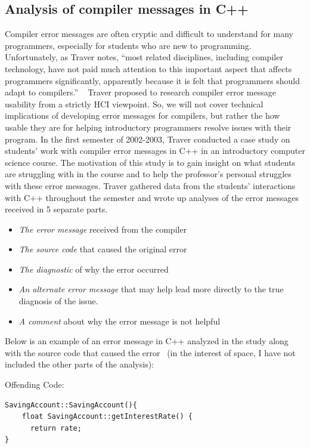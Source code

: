 \documentclass{sig-alternate}
\begin{document}
\subsection{Analysis of compiler messages in C++}\label{subsec:compiler analysis}


Compiler error messages are often cryptic and difficult to understand for many programmers, especially for students who are new to programming.
Unfortunately, as Traver notes, ``most related disciplines, including compiler technology, have not paid much attention to this important aspect that affects programmers significantly, apparently because it is felt that programmers should adapt to compilers.'' ~\cite{Traver:2010}
Traver proposed to research compiler error message usability from a strictly HCI viewpoint.
So, we will not cover technical implications of developing error messages for compilers, but rather the how usable they are for helping introductory programmers resolve issues with their program.
In the first semester of 2002-2003, Traver conducted a case study on students' work with compiler error messages in C++ in an introductory computer science course.
The motivation of this study is to gain insight on what students are struggling with in the course and to help the professor's personal struggles with these error messages.
Traver gathered data from the students' interactions with C++ throughout the semester and wrote up analyses of the error messages received in 5 separate parts.
\begin{itemize}
	\item \textit{The error message} received from the compiler
	\item \textit{The source code} that caused the original error
	\item \textit{The diagnostic} of why the error occurred
	\item \textit{An alternate error message} that may help lead more directly to the true diagnosis of the issue.
	\item \textit{A comment} about why the error message is not helpful
\end{itemize}

Below is an example of an error message in C++ analyzed in the study along with the source code that caused the error~\cite{Traver:2010} (in the interest of space, I have not included the other parts of the analysis):

Offending Code:
\begin{verbatim}
SavingAccount::SavingAccount(){
    float SavingAccount::getInterestRate() {
   	  return rate;
}
\end{verbatim}
\end{document}
